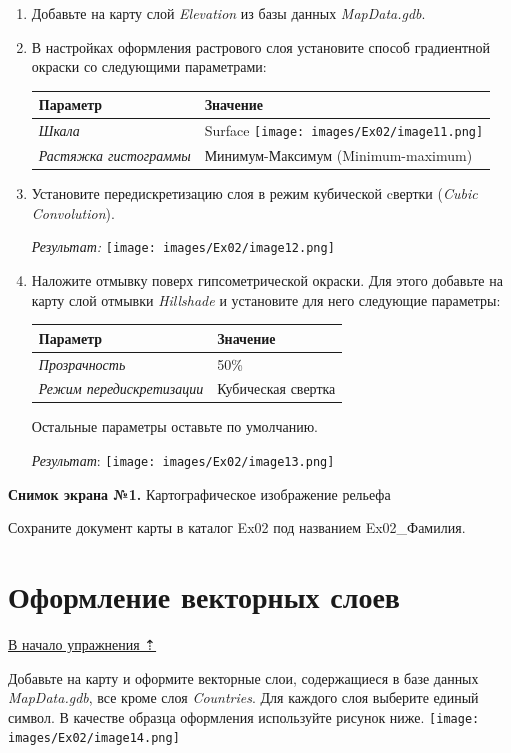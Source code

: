 \documentclass[12pt,]{book}
\begin{document}
\begin{enumerate}
\def\labelenumi{\arabic{enumi}.}
\item
  Добавьте на карту слой \emph{Elevation} из базы данных \emph{MapData.gdb}.
\item
  В настройках оформления растрового слоя установите способ градиентной окраски со следующими параметрами:

  \begin{longtable}[]{@{}ll@{}}
  \toprule
  Параметр & Значение\tabularnewline
  \midrule
  \endhead
  \emph{Шкала} & Surface \texttt{[image: images/Ex02/image11.png]}\tabularnewline
  \emph{Растяжка гистограммы} & Минимум-Максимум (Minimum-maximum)\tabularnewline
  \bottomrule
  \end{longtable}
\item
  Установите передискретизацию слоя в режим кубической cвертки (\emph{Cubic Convolution}).

  \emph{Результат:}
  \texttt{[image: images/Ex02/image12.png]}
\item
  Наложите отмывку поверх гипсометрической окраски. Для этого добавьте на карту слой отмывки \emph{Hillshade} и установите для него следующие параметры:

  \begin{longtable}[]{@{}ll@{}}
  \toprule
  Параметр & Значение\tabularnewline
  \midrule
  \endhead
  \emph{Прозрачность} & 50\%\tabularnewline
  \emph{Режим передискретизации} & Кубическая свертка\tabularnewline
  \bottomrule
  \end{longtable}

  Остальные параметры оставьте по умолчанию.

  \emph{Результат}:
  \texttt{[image: images/Ex02/image13.png]}
\end{enumerate}

\textbf{Снимок экрана №1.} Картографическое изображение рельефа

Сохраните документ карты в каталог Ex02 под названием Ex02\_Фамилия.

\hypertarget{map-design-general-vector}{%
\section{Оформление векторных слоев}\label{map-design-general-vector}}

\protect\hyperlink{map-design-general}{В начало упражнения ⇡}

Добавьте на карту и оформите векторные слои, содержащиеся в базе данных \emph{MapData.gdb}, все кроме слоя \emph{Countries}. Для каждого слоя выберите единый символ. В качестве образца оформления используйте рисунок ниже.
\texttt{[image: images/Ex02/image14.png]}
\end{document}
